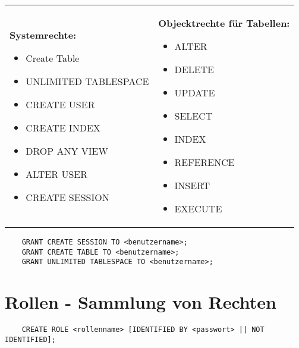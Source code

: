 \documentclass[12pt]{scrreprt}
\begin{document}
\begin{tabular}{ll}
 \parbox{7cm}{
 \textbf{Systemrechte:}
\begin{itemize}
	\item Create Table
	\item UNLIMITED TABLESPACE
	\item CREATE USER
	\item CREATE INDEX
	\item DROP ANY VIEW
	\item ALTER USER
	\item CREATE SESSION
\end{itemize}}
 &
 \parbox{10cm}{
 \textbf{Objecktrechte für Tabellen:}
\begin{itemize}
	\item ALTER
	\item DELETE
	\item UPDATE
	\item SELECT
	\item INDEX
	\item REFERENCE
	\item INSERT
	\item EXECUTE
\end{itemize}}
\end{tabular}

\begin{lstlisting}
	GRANT CREATE SESSION TO <benutzername>;
	GRANT CREATE TABLE TO <benutzername>;
	GRANT UNLIMITED TABLESPACE TO <benutzername>;
\end{lstlisting}

\section{Rollen - Sammlung von Rechten}
\begin{lstlisting}
	CREATE ROLE <rollenname> [IDENTIFIED BY <passwort> || NOT IDENTIFIED];
\end{lstlisting}
\end{document}
